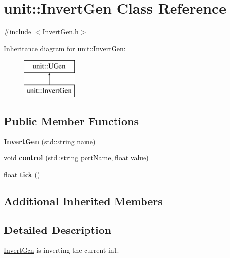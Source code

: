 \hypertarget{classunit_1_1InvertGen}{}\section{unit\+:\+:Invert\+Gen Class Reference}
\label{classunit_1_1InvertGen}


{\ttfamily \#include $<$Invert\+Gen.\+h$>$}

Inheritance diagram for unit\+:\+:Invert\+Gen\+:\begin{figure}[H]
\begin{center}
\leavevmode
\includegraphics[height=2.000000cm]{classunit_1_1InvertGen}
\end{center}
\end{figure}
\subsection*{Public Member Functions}
\begin{DoxyCompactItemize}
\item 
{\bfseries Invert\+Gen} (std\+::string name)\hypertarget{classunit_1_1InvertGen_a6df9413e609ffe377f728d38c9107f97}{}\label{classunit_1_1InvertGen_a6df9413e609ffe377f728d38c9107f97}

\item 
void {\bfseries control} (std\+::string port\+Name, float value)\hypertarget{classunit_1_1InvertGen_a7f239d73ca02d40f4e2cda336887a852}{}\label{classunit_1_1InvertGen_a7f239d73ca02d40f4e2cda336887a852}

\item 
float {\bfseries tick} ()\hypertarget{classunit_1_1InvertGen_aacbd94fb460ccf492408d987a609cc8c}{}\label{classunit_1_1InvertGen_aacbd94fb460ccf492408d987a609cc8c}

\end{DoxyCompactItemize}
\subsection*{Additional Inherited Members}


\subsection{Detailed Description}
\hyperlink{classunit_1_1InvertGen}{Invert\+Gen} is inverting the current in1.

